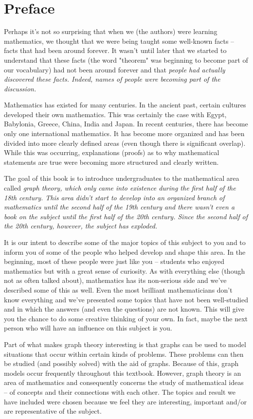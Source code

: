 \chapter{Preface}
Perhaps it's not so surprising that when we (the authors) were learning mathematics, we thought that we were being taught some well-known facts -- facts that had been around forever. It wasn't until later that we started to understand that these facts (the word "theorem" was beginning to become part of our vocabulary) had not been around forever and that \it{people} had actually discovered these facts. Indeed, \it{names} of people were becoming part of the discussion.

Mathematics has existed for many centuries. In the ancient past, certain cultures developed their own mathematics. This was certainly the case with Egypt, Babylonia, Greece, China, India and Japan. In recent centuries, there has become only one international mathematics. It has become more organized and has been divided into more clearly defined areas (even though there is significant overlap). While this was occurring, explanations (proofs) as to why mathematical statements are true were becoming more structured and clearly written.

The goal of this book is to introduce undergraduates to the mathematical area called \it{graph theory}, which only came into existence during the first half of the 18th century. This area didn't start to develop into an organized branch of mathematics until the second half of the 19th century and there wasn't even a book on the subject until the first half of the 20th century. Since the second half of the 20th century, however, the subject has exploded.

It is our intent to describe some of the major topics of this subject to you and to inform you of some of the people who helped develop and shape this area. In the beginning, most of these people were just like you -- students who enjoyed mathematics but with a great sense of curiosity. As with everything else (though not as often talked about), mathematics has its non-serious side and we've described some of this as well. Even the most brilliant mathematicians don't know everything and we've presented some topics that have not been well-studied and in which the answers (and even the questions) are not known. This will give you the chance to do some creative thinking of your own. In fact, maybe the next person who will have an influence on this subject is you.

Part of what makes graph theory interesting is that graphs can be used to model situations that occur within certain kinds of problems. These problems can then be studied (and possibly solved) with the aid of graphs. Because of this, graph models occur frequently throughout this textbook. However, graph theory is an area of mathematics and consequently concerns the study of mathematical ideas -- of concepts and their connections with each other. The topics and result we have included were chosen because we feel they are interesting, important and/or are representative of the subject.


